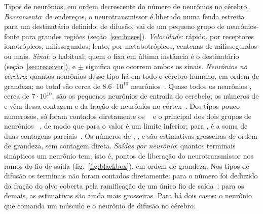 \begin{table}[t]
\caption{Tipos de neurônios, em ordem decrescente do número de neurônios no cérebro. \emph{Barramento}: de endereços, o neurotransmissor é liberado numa fenda estreita para um destinatário definido; de difusão, vai de um pequeno grupo de neurônios-fonte para grandes regiões (seção~\ref{sec:buses}). \emph{Velocidade}: rápido, por receptores ionotrópicos, milissegundos; lento, por metabotrópicos, centenas de milissegundos ou mais. \emph{Sinal}: o habitual; quem o fixa em última instância é o destinatário (seção~\ref{sec:receiver}), e $\pm$ significa que ocorrem ambos os sinais. \emph{Neurônios no cérebro}: quantos neurônios desse tipo há em todo o cérebro humano, em ordem de grandeza; no total são cerca de $8.6\cdot10^{10}$ neurônios~\cite{Azevedo2009}. Quase todos os neurônios , cerca de $7\cdot10^{10}$, são os pequenos neurônios de entrada do cerebelo; os números de  e  vêm dessa contagem e da fração de neurônios  no córtex~\cite{Hendry1987}. Dos tipos pouco numerosos, só foram contados diretamente os ~\cite{Airaksinen1991} e o principal dos dois grupos de neurônios ~\cite{Pakkenberg1991}, de modo que para  o valor é um limite inferior; para , é a soma de duas contagens parciais~\cite{Baker1990,Baker1991}. Os números de , ,  e  são estimativas grosseiras de ordem de grandeza, sem contagem direta. \emph{Saídas por neurônio}: quantos terminais sinápticos um neurônio tem, isto é, pontos de liberação do neurotransmissor nos ramos do fio de saída (fig.~\ref{fig:blackbox}), em ordem de grandeza. Nos tipos de difusão os terminais não foram contados diretamente: para  o número foi deduzido da fração do alvo coberta pela ramificação de um único fio de saída~\cite{Matsuda2009}; para os demais, as estimativas são ainda mais grosseiras. Para  há dois casos: o neurônio que comanda um músculo e o neurônio de difusão no cérebro.}
\label{tab:types}
\end{table}

